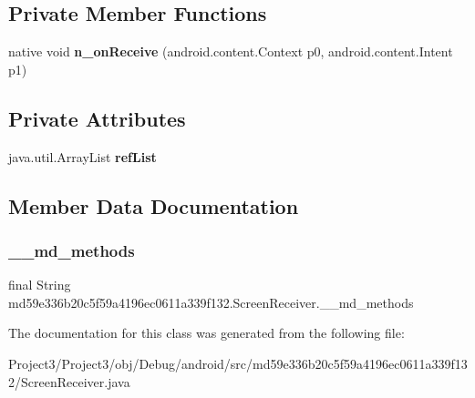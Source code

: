 \subsection*{Private Member Functions}
\begin{DoxyCompactItemize}
\item 
\mbox{\label{classmd59e336b20c5f59a4196ec0611a339f132_1_1ScreenReceiver_aae811500a198c33b0f5b86541d266e58}} 
native void {\bfseries n\+\_\+on\+Receive} (android.\+content.\+Context p0, android.\+content.\+Intent p1)
\end{DoxyCompactItemize}
\subsection*{Private Attributes}
\begin{DoxyCompactItemize}
\item 
\mbox{\label{classmd59e336b20c5f59a4196ec0611a339f132_1_1ScreenReceiver_ab0ce4377791ba633c4f927c4adc3ec10}} 
java.\+util.\+Array\+List {\bfseries ref\+List}
\end{DoxyCompactItemize}


\subsection{Member Data Documentation}
\mbox{\label{classmd59e336b20c5f59a4196ec0611a339f132_1_1ScreenReceiver_a85a11d9d021127da44fece55f1773028}} 
\subsubsection{\texorpdfstring{\+\_\+\+\_\+md\+\_\+methods}{\_\_md\_methods}}
{\footnotesize\ttfamily final String md59e336b20c5f59a4196ec0611a339f132.\+Screen\+Receiver.\+\_\+\+\_\+md\+\_\+methods\hspace{0.3cm}{\ttfamily [static]}}



The documentation for this class was generated from the following file\+:\begin{DoxyCompactItemize}
\item 
Project3/\+Project3/obj/\+Debug/android/src/md59e336b20c5f59a4196ec0611a339f132/Screen\+Receiver.\+java\end{DoxyCompactItemize}
